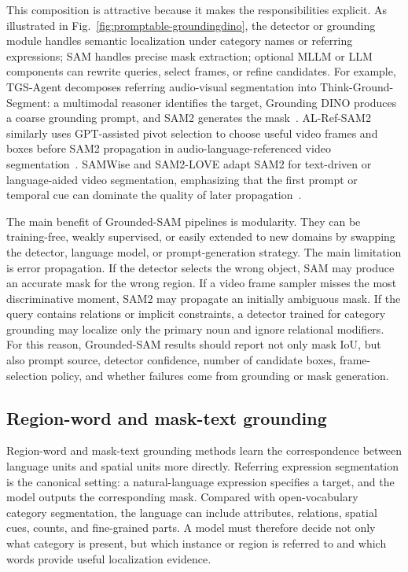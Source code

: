 This composition is attractive because it makes the responsibilities explicit. As illustrated in Fig.~\ref{fig:promptable-groundingdino}, the detector or grounding module handles semantic localization under category names or referring expressions; SAM handles precise mask extraction; optional MLLM or LLM components can rewrite queries, select frames, or refine candidates. For example, TGS-Agent decomposes referring audio-visual segmentation into Think-Ground-Segment: a multimodal reasoner identifies the target, Grounding DINO produces a coarse grounding prompt, and SAM2 generates the mask~\citep{zhouThinkYouSegment2026}. AL-Ref-SAM2 similarly uses GPT-assisted pivot selection to choose useful video frames and boxes before SAM2 propagation in audio-language-referenced video segmentation~\citep{huangUnleashingTemporalspatialReasoning2025}. SAMWise and SAM2-LOVE adapt SAM2 for text-driven or language-aided video segmentation, emphasizing that the first prompt or temporal cue can dominate the quality of later propagation~\citep{cuttanoSamwiseInfusingWisdom2025,wangSam2loveSegmentAnything2025}.

The main benefit of Grounded-SAM pipelines is modularity. They can be training-free, weakly supervised, or easily extended to new domains by swapping the detector, language model, or prompt-generation strategy. The main limitation is error propagation. If the detector selects the wrong object, SAM may produce an accurate mask for the wrong region. If a video frame sampler misses the most discriminative moment, SAM2 may propagate an initially ambiguous mask. If the query contains relations or implicit constraints, a detector trained for category grounding may localize only the primary noun and ignore relational modifiers. For this reason, Grounded-SAM results should report not only mask IoU, but also prompt source, detector confidence, number of candidate boxes, frame-selection policy, and whether failures come from grounding or mask generation.

\subsection{Region-word and mask-text grounding}

Region-word and mask-text grounding methods learn the correspondence between language units and spatial units more directly. Referring expression segmentation is the canonical setting: a natural-language expression specifies a target, and the model outputs the corresponding mask. Compared with open-vocabulary category segmentation, the language can include attributes, relations, spatial cues, counts, and fine-grained parts. A model must therefore decide not only what category is present, but which instance or region is referred to and which words provide useful localization evidence.

